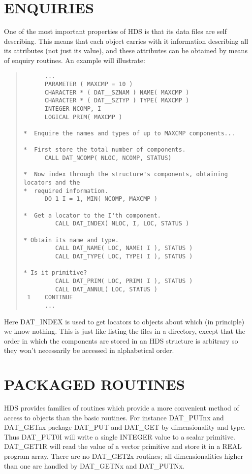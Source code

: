 \documentclass[11pt]{article}
\newcommand{\htmlref}[2]{#1}
\newcommand{\xlabel}[1]{}
\begin{document}
\section{\xlabel{enquiries}ENQUIRIES}

One of the most important properties of HDS is that its data files are
self describing. This means that each object carries with it
information describing all its attributes (not just its value), and
these attributes can be obtained by means of enquiry routines. An
example will illustrate:

\small
\begin{quote}
\begin{verbatim}
      ...
      PARAMETER ( MAXCMP = 10 )
      CHARACTER * ( DAT__SZNAM ) NAME( MAXCMP )
      CHARACTER * ( DAT__SZTYP ) TYPE( MAXCMP )
      INTEGER NCOMP, I
      LOGICAL PRIM( MAXCMP )

*  Enquire the names and types of up to MAXCMP components...

*  First store the total number of components.
      CALL DAT_NCOMP( NLOC, NCOMP, STATUS)

*  Now index through the structure's components, obtaining locators and the
*  required information.
      DO 1 I = 1, MIN( NCOMP, MAXCMP )

*  Get a locator to the I'th component.
         CALL DAT_INDEX( NLOC, I, LOC, STATUS )

* Obtain its name and type.
         CALL DAT_NAME( LOC, NAME( I ), STATUS )
         CALL DAT_TYPE( LOC, TYPE( I ), STATUS )

* Is it primitive?
         CALL DAT_PRIM( LOC, PRIM( I ), STATUS )
         CALL DAT_ANNUL( LOC, STATUS )
 1    CONTINUE
      ...
\end{verbatim}
\end{quote}
\normalsize

Here \htmlref{DAT\_INDEX}{DAT_INDEX} is used to get \htmlref{locators}{sect:locators} to
objects about which (in principle) we know nothing. This is just like
listing the files in a directory, except that the order in which the
components are stored in an HDS structure is arbitrary so they won't
necessarily be accessed in alphabetical order.

\section{\xlabel{packaged_routines}PACKAGED ROUTINES}

HDS provides families of routines which provide a more convenient
method of access to objects than the basic routines. For instance
DAT\_PUTnx and DAT\_GETnx package \htmlref{DAT\_PUT}{DAT_PUT} and
\htmlref{DAT\_GET}{DAT_GET} by dimensionality and
\htmlref{type}{sect:type}. Thus \htmlref{DAT\_PUT0I}{DAT_PUT0x} will
write a single INTEGER value to a scalar
primitive. \htmlref{DAT\_GET1R}{DAT_GET1x} will read the value of a
vector primitive and store it in a REAL program array. There are no
DAT\_GET2x routines; all dimensionalities higher than one are handled
by \htmlref{DAT\_GETNx}{DAT_GETNx} and
\htmlref{DAT\_PUTNx}{DAT_PUTNx}.
\end{document}

